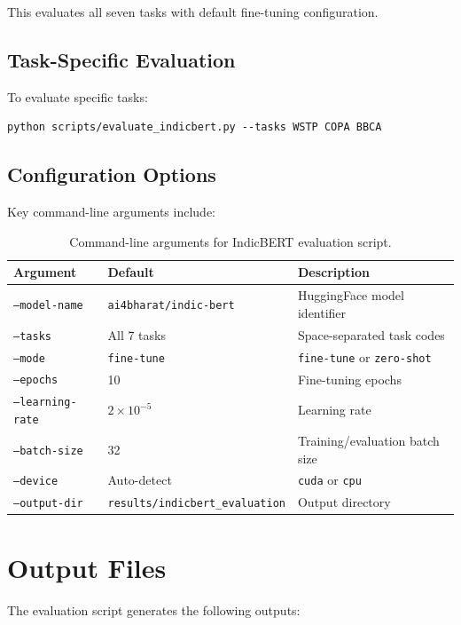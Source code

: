 This evaluates all seven tasks with default fine-tuning configuration.

\subsection{Task-Specific Evaluation}

To evaluate specific tasks:

\begin{verbatim}
python scripts/evaluate_indicbert.py --tasks WSTP COPA BBCA
\end{verbatim}

\subsection{Configuration Options}

Key command-line arguments include:

\begin{table}[h]
\centering
\small
\begin{tabular}{llp{5cm}}
\toprule
\textbf{Argument} & \textbf{Default} & \textbf{Description} \\
\midrule
\texttt{--model-name} & \texttt{ai4bharat/indic-bert} & HuggingFace model identifier \\
\texttt{--tasks} & All 7 tasks & Space-separated task codes \\
\texttt{--mode} & \texttt{fine-tune} & \texttt{fine-tune} or \texttt{zero-shot} \\
\texttt{--epochs} & 10 & Fine-tuning epochs \\
\texttt{--learning-rate} & $2 \times 10^{-5}$ & Learning rate \\
\texttt{--batch-size} & 32 & Training/evaluation batch size \\
\texttt{--device} & Auto-detect & \texttt{cuda} or \texttt{cpu} \\
\texttt{--output-dir} & \texttt{results/indicbert\_evaluation} & Output directory \\
\bottomrule
\end{tabular}
\caption{Command-line arguments for IndicBERT evaluation script.}
\label{tab:cli-args}
\end{table}

\section{Output Files}
\label{sec:output-files}

The evaluation script generates the following outputs:

